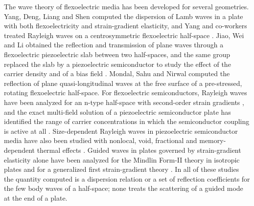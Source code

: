 The wave theory of flexoelectric media has been developed for several
geometries.  Yang, Deng, Liang and Shen \cite{yang2018lamb} computed the
dispersion of Lamb waves in a plate with both flexoelectricity and
strain-gradient elasticity, and Yang and co-workers treated Rayleigh waves on a
centrosymmetric flexoelectric half-space \cite{yang2020rayleigh}.  Jiao, Wei and
Li \cite{jiao2018slab} obtained the reflection and transmission of plane waves
through a flexoelectric piezoelectric slab between two half-spaces, and the same
group replaced the slab by a piezoelectric semiconductor to study the effect of
the carrier density and of a bias field \cite{jiao2019semiconductor}.  Mondal,
Sahu and Nirwal \cite{mondal2022scattering} computed the reflection of plane
quasi-longitudinal waves at the free surface of a pre-stressed, rotating
flexoelectric half-space.  For flexoelectric semiconductors, Rayleigh waves have been analyzed for an n-type half-space with second-order strain gradients \cite{biswas2025rayleigh}, and the exact multi-field solution of a
piezoelectric semiconductor plate has identified the range of carrier
concentrations in which the semiconductor coupling is active at all
\cite{zhang2025pscplate}.  Size-dependent Rayleigh waves in piezoelectric semiconductor media
have also been studied with nonlocal, void, fractional and memory-dependent
thermal effects \cite{gupta2025psvoid}.  Guided waves in plates governed by strain-gradient
elasticity alone have been analyzed for the Mindlin Form-II theory in isotropic
plates \cite{vavva2009gradient} and for a generalized first strain-gradient
theory \cite{sidhardh2019microplate}.  In all of these studies the quantity
computed is a dispersion relation or a set of reflection coefficients for the
few body waves of a half-space; none treats the scattering of a guided mode at
the end of a plate.

